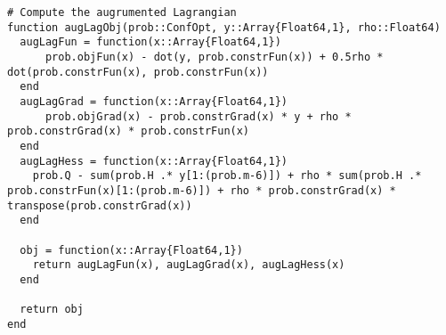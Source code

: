 \documentclass{article} %
\begin{document}
\begin{lstlisting}
# Compute the augrumented Lagrangian
function augLagObj(prob::ConfOpt, y::Array{Float64,1}, rho::Float64)
  augLagFun = function(x::Array{Float64,1})
      prob.objFun(x) - dot(y, prob.constrFun(x)) + 0.5rho * dot(prob.constrFun(x), prob.constrFun(x))
  end
  augLagGrad = function(x::Array{Float64,1})
      prob.objGrad(x) - prob.constrGrad(x) * y + rho * prob.constrGrad(x) * prob.constrFun(x)
  end
  augLagHess = function(x::Array{Float64,1})
    prob.Q - sum(prob.H .* y[1:(prob.m-6)]) + rho * sum(prob.H .* prob.constrFun(x)[1:(prob.m-6)]) + rho * prob.constrGrad(x) * transpose(prob.constrGrad(x))
  end

  obj = function(x::Array{Float64,1}) 
    return augLagFun(x), augLagGrad(x), augLagHess(x)
  end

  return obj
end
\end{lstlisting}
\end{document}
